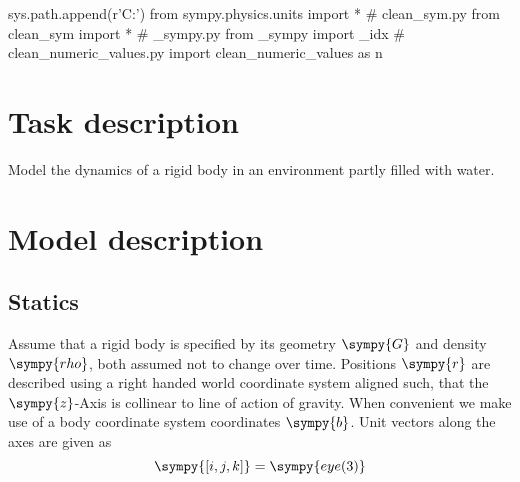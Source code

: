 \documentclass[12pt,a4paper]{article}
\newcommand{\s}{\sympy}
\begin{document}
\tableofcontents

\begin{sympycode}
sys.path.append(r'C:\Users\Murad\evrythg')
from sympy.physics.units import *
# clean_sym.py
from clean_sym import *
# _sympy.py 
from _sympy import _idx
# clean_numeric_values.py
import clean_numeric_values as n
\end{sympycode}

\begin{pythoncode}
\end{pythoncode}


\section{Task description}
Model the dynamics of a rigid body in an environment partly filled with water.
\section{Model description}
\subsection{Statics}
Assume that a rigid body is specified by its geometry $\s{G}$ and density $\s{rho}$, both assumed not to change over time.    Positions $\s{r}$ are described using a right handed world coordinate system aligned such, that the $\s{z}$-Axis is collinear to line of action of gravity.  When convenient we make use of a body coordinate system coordinates $\s{b}$.  Unit vectors along the axes are given as
\begin{equation*}
\s{[i, j, k]} = \s{eye(3)}
\end{equation*}
\end{document}
